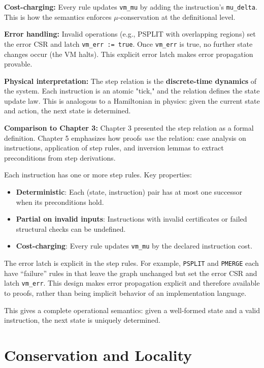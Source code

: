\textbf{Cost-charging:} Every rule updates \texttt{vm\_mu} by adding the instruction's \texttt{mu\_delta}. This is how the semantics enforces $\mu$-conservation at the definitional level.

\textbf{Error handling:} Invalid operations (e.g., PSPLIT with overlapping regions) set the error CSR and latch \texttt{vm\_err := true}. Once \texttt{vm\_err} is true, no further state changes occur (the VM halts). This explicit error latch makes error propagation provable.


\textbf{Physical interpretation:} The step relation is the \textbf{discrete-time dynamics} of the system. Each instruction is an atomic "tick," and the relation defines the state update law. This is analogous to a Hamiltonian in physics: given the current state and action, the next state is determined.

\textbf{Comparison to Chapter 3:} Chapter 3 presented the step relation as a formal definition. Chapter 5 emphasizes how proofs \textit{use} the relation: case analysis on instructions, application of step rules, and inversion lemmas to extract preconditions from step derivations.

Each instruction has one or more step rules. Key properties:
\begin{itemize}
    \item \textbf{Deterministic}: Each (state, instruction) pair has at most one successor when its preconditions hold.
    \item \textbf{Partial on invalid inputs}: Instructions with invalid certificates or failed structural checks can be undefined.
    \item \textbf{Cost-charging}: Every rule updates \texttt{vm\_mu} by the declared instruction cost.
\end{itemize}
The error latch is explicit in the step rules. For example, \texttt{PSPLIT} and \texttt{PMERGE} each have “failure” rules in  that leave the graph unchanged but set the error CSR and latch \texttt{vm\_err}. This design makes error propagation explicit and therefore available to proofs, rather than being implicit behavior of an implementation language.

This gives a complete operational semantics: given a well-formed state and a valid instruction, the next state is uniquely determined.

\section{Conservation and Locality}

